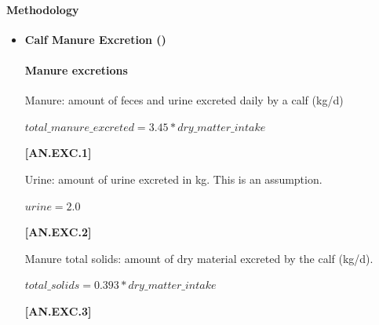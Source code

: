 \documentclass{article}
\begin{document}
\begin{refsection}
    
    \paragraph{Methodology}

    \begin{itemize}
        \item \textbf{Calf Manure Excretion ()}

\paragraph{Manure excretions}
\vspace{-0.25cm}

Manure: amount of feces and urine excreted daily by a calf (kg/d)
        \vspace{0.5cm}        
    
    \begin{center}
        \(total\_manure\_excreted = 3.45 * dry\_matter\_intake\)
    \end{center}
        \vspace{0.5cm} 
    
            {\raggedleft \textbf{[AN.EXC.1]}\par}
            \vspace{0.5cm} 
 
            
Urine: amount of urine excreted in kg. This is an assumption. 
        \vspace{0.5cm}        
    
    \begin{center}
        \(urine = 2.0\)
    \end{center}
        \vspace{0.5cm} 
    
            {\raggedleft \textbf{[AN.EXC.2]}\par}
            \vspace{0.5cm} 

Manure total solids: amount of dry material excreted by the calf (kg/d). 
        \vspace{0.5cm}  
    
    \begin{center}
        \(total\_solids = 0.393 * dry\_matter\_intake\)
    \end{center}
        \vspace{0.5cm} 
    
            {\raggedleft \textbf{[AN.EXC.3]}\par}
            \vspace{0.5cm} 
            

\end{itemize}
\end{refsection}
\end{document}
